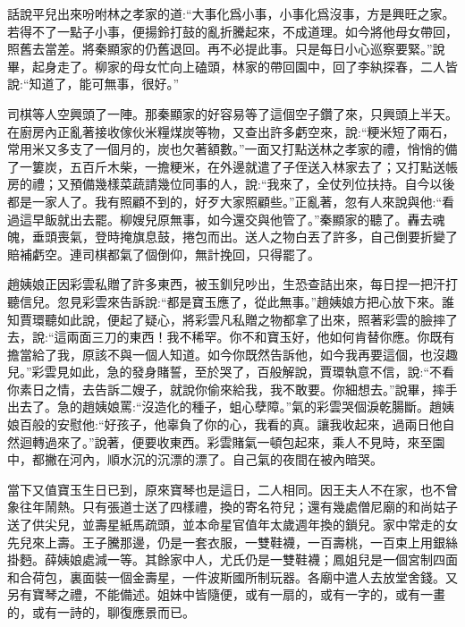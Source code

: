 

\begin{parag}
    話說平兒出來吩咐林之孝家的道:“大事化爲小事，小事化爲沒事，方是興旺之家。若得不了一點子小事，便揚鈴打鼓的亂折騰起來，不成道理。如今將他母女帶回，照舊去當差。將秦顯家的仍舊退回。再不必提此事。只是每日小心巡察要緊。”說畢，起身走了。柳家的母女忙向上磕頭，林家的帶回園中，回了李紈探春，二人皆說:“知道了，能可無事，很好。”
\end{parag}


\begin{parag}
    司棋等人空興頭了一陣。那秦顯家的好容易等了這個空子鑽了來，只興頭上半天。在廚房內正亂著接收傢伙米糧煤炭等物，又查出許多虧空來，說:“粳米短了兩石，常用米又多支了一個月的，炭也欠著額數。”一面又打點送林之孝家的禮，悄悄的備了一簍炭，五百斤木柴，一擔粳米，在外邊就遣了子侄送入林家去了；又打點送帳房的禮；又預備幾樣菜蔬請幾位同事的人，說:“我來了，全仗列位扶持。自今以後都是一家人了。我有照顧不到的，好歹大家照顧些。”正亂著，忽有人來說與他:“看過這早飯就出去罷。柳嫂兒原無事，如今還交與他管了。”秦顯家的聽了。轟去魂魄，垂頭喪氣，登時掩旗息鼓，捲包而出。送人之物白丟了許多，自己倒要折變了賠補虧空。連司棋都氣了個倒仰，無計挽回，只得罷了。
\end{parag}


\begin{parag}
    趙姨娘正因彩雲私贈了許多東西，被玉釧兒吵出，生恐查詰出來，每日捏一把汗打聽信兒。忽見彩雲來告訴說:“都是寶玉應了，從此無事。”趙姨娘方把心放下來。誰知賈環聽如此說，便起了疑心，將彩雲凡私贈之物都拿了出來，照著彩雲的臉摔了去，說:“這兩面三刀的東西！我不稀罕。你不和寶玉好，他如何肯替你應。你既有擔當給了我，原該不與一個人知道。如今你既然告訴他，如今我再要這個，也沒趣兒。”彩雲見如此，急的發身賭誓，至於哭了，百般解說，賈環執意不信，說:“不看你素日之情，去告訴二嫂子，就說你偷來給我，我不敢要。你細想去。”說畢，摔手出去了。急的趙姨娘罵:“沒造化的種子，蛆心孽障。”氣的彩雲哭個淚乾腸斷。趙姨娘百般的安慰他:“好孩子，他辜負了你的心，我看的真。讓我收起來，過兩日他自然迴轉過來了。”說著，便要收東西。彩雲賭氣一頓包起來，乘人不見時，來至園中，都撇在河內，順水沉的沉漂的漂了。自己氣的夜間在被內暗哭。
\end{parag}


\begin{parag}
    當下又值寶玉生日已到，原來寶琴也是這日，二人相同。因王夫人不在家，也不曾象往年鬧熱。只有張道士送了四樣禮，換的寄名符兒；還有幾處僧尼廟的和尚姑子送了供尖兒，並壽星紙馬疏頭，並本命星官值年太歲週年換的鎖兒。家中常走的女先兒來上壽。王子騰那邊，仍是一套衣服，一雙鞋襪，一百壽桃，一百束上用銀絲掛麪。薛姨娘處減一等。其餘家中人，尤氏仍是一雙鞋襪；鳳姐兒是一個宮制四面和合荷包，裏面裝一個金壽星，一件波斯國所制玩器。各廟中遣人去放堂舍錢。又另有寶琴之禮，不能備述。姐妹中皆隨便，或有一扇的，或有一字的，或有一畫的，或有一詩的，聊復應景而已。
\end{parag}


